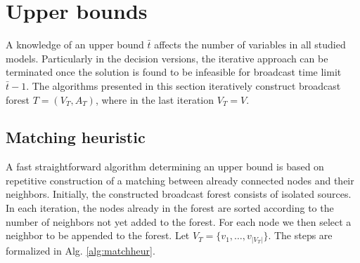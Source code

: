 \section{Upper bounds} \label{sec:ub}

A knowledge of an upper bound $\bar{t}$ affects the number of variables in all studied models. 
Particularly in the decision versions, the iterative approach can be terminated once the solution is found to be infeasible for broadcast time limit $\bar{t}-1$.
The algorithms presented in this section iteratively construct broadcast forest $T=(V_T,A_T)$, where in the last iteration $V_T=V$.
\subsection{Matching heuristic}

A fast straightforward algorithm determining an upper bound is based on repetitive construction of a matching between already connected nodes and their neighbors.
Initially, the constructed broadcast forest consists of isolated sources. 
In each iteration, the nodes already in the forest are sorted according to the number of neighbors not yet added to the forest.
For each node we then select a neighbor to be appended to the forest.
Let $V_T=\{v_1,\dots,v_{|V_T|}\}$.
The steps are formalized in Alg. \ref{alg:matchheur}.

